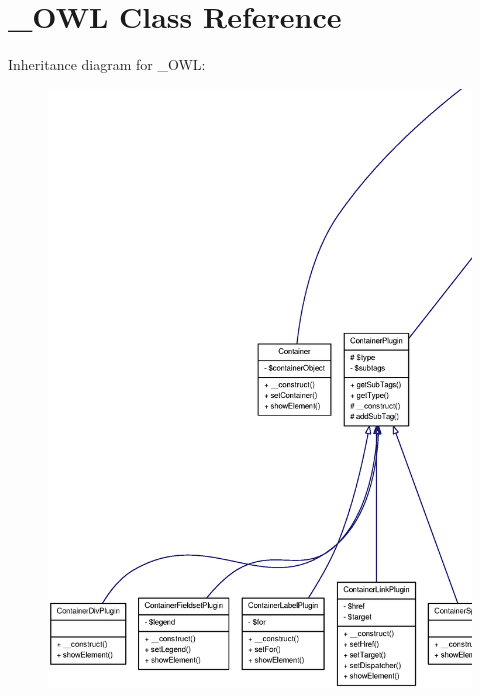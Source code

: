 \section{\_\-OWL Class Reference}
\label{class__OWL}


Inheritance diagram for \_\-OWL:
\nopagebreak
\begin{figure}[H]
\begin{center}
\leavevmode
\includegraphics[width=400pt]{class__OWL__inherit__graph}
\end{center}
\end{figure}
